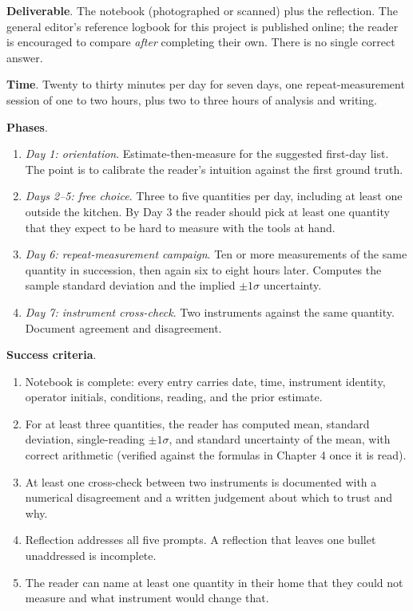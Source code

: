 \begin{project}
\textbf{Deliverable}. The notebook (photographed or scanned) plus
the reflection. The general editor's reference logbook for this
project is published online; the reader is encouraged to compare
\emph{after} completing their own. There is no single correct
answer.

\textbf{Time}. Twenty to thirty minutes per day for seven days, one
repeat-measurement session of one to two hours, plus two to three
hours of analysis and writing.

\textbf{Phases}.
\begin{enumerate}[leftmargin=*]
  \item \emph{Day 1: orientation}. Estimate-then-measure for the
    suggested first-day list. The point is to calibrate the
    reader's intuition against the first ground truth.
  \item \emph{Days 2--5: free choice}. Three to five quantities
    per day, including at least one outside the kitchen. By Day 3
    the reader should pick at least one quantity that they expect
    to be hard to measure with the tools at hand.
  \item \emph{Day 6: repeat-measurement campaign}. Ten or more
    measurements of the same quantity in succession, then again
    six to eight hours later. Computes the sample standard
    deviation and the implied $\pm 1\sigma$ uncertainty.
  \item \emph{Day 7: instrument cross-check}. Two instruments
    against the same quantity. Document agreement and
    disagreement.
\end{enumerate}

\textbf{Success criteria}.
\begin{enumerate}[leftmargin=*]
  \item Notebook is complete: every entry carries date, time,
    instrument identity, operator initials, conditions, reading,
    and the prior estimate.
  \item For at least three quantities, the reader has computed
    mean, standard deviation, single-reading $\pm 1\sigma$, and
    standard uncertainty of the mean, with correct arithmetic
    (verified against the formulas in Chapter 4 once it is read).
  \item At least one cross-check between two instruments is
    documented with a numerical disagreement and a written
    judgement about which to trust and why.
  \item Reflection addresses all five prompts. A reflection that
    leaves one bullet unaddressed is incomplete.
  \item The reader can name at least one quantity in their home
    that they could not measure and what instrument would change
    that.
\end{enumerate}


\end{project}
